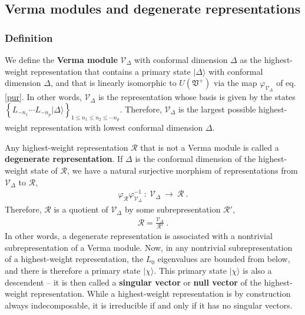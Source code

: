 \documentclass[12pt, a4paper, notitlepage, twoside]{report}
\numberwithin{equation}{section}
\theoremstyle{break}
\begin{document}
\subsection{Verma modules and degenerate representations \label{secvm}}

\subsubsection{Definition}

We define the \textbf{\boldmath Verma module} $\mathcal{V}_\Delta$ with conformal dimension $\Delta$ as the highest-weight representation that contains a primary state $|\Delta\rangle$ with conformal dimension $\Delta$, and that is linearly isomorphic to $U(\mathfrak{V}^+)$ via the map $\varphi_{\mathcal{V}_\Delta}$ of eq. \eqref{pur}.
In other words, $\mathcal{V}_\Delta$ is the representation whose basis is given by the states  $\left\{ L_{-n_1} \cdots L_{-n_p}|\Delta\rangle\right\}_{1\leq n_1\leq n_2\leq \cdots n_p}$.
Therefore, $\mathcal{V}_\Delta$ is the largest possible highest-weight representation with lowest conformal dimension $\Delta$. 

Any  highest-weight representation $\mathcal{R}$ that is not a Verma module is called a \textbf{\boldmath degenerate representation}.
If $\Delta$ is the conformal dimension of the highest-weight state of $\mathcal{R}$, we have a natural surjective morphism of representations from $\mathcal{V}_\Delta$ to $\mathcal{R}$,
\begin{align}
\varphi_\mathcal{R} \varphi_{\mathcal{V}_\Delta}^{-1}\ : \  \mathcal{V}_\Delta\ \rightarrow\ \mathcal{R} \ .
\end{align}
Therefore, $\mathcal{R}$ is a quotient of $\mathcal{V}_\Delta$ by some subrepresentation $\mathcal{R}'$,
\begin{align}
 \mathcal{R} = \frac{\mathcal{V}_\Delta}{\mathcal{R}'}\ .
\label{rvrp}
\end{align}
In other words, a degenerate representation is associated with a nontrivial subrepresentation of a Verma module.
Now, in any nontrivial subrepresentation of a highest-weight representation, the $L_0$ eigenvalues are bounded from below, and there is therefore a primary state $|\chi\rangle$.
This primary state $|\chi\rangle$ is also a descendent -- it is then called a \textbf{\boldmath singular vector} or \textbf{\boldmath null vector} of the highest-weight representation.
While a highest-weight representation is by construction always indecomposable, it is irreducible if and only if it has no singular vectors.
\end{document}
